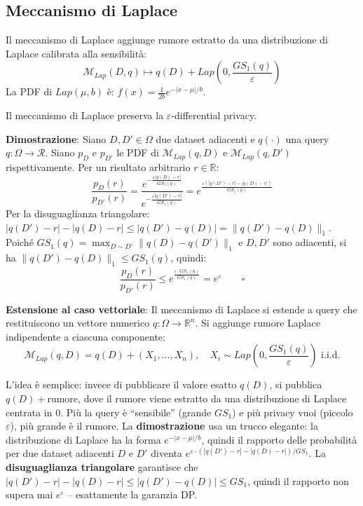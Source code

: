 \documentclass[a4paper,11pt]{article}
\begin{document}
\subsection{Meccanismo di Laplace}

\begin{teorema}
Il meccanismo di Laplace aggiunge rumore estratto da una distribuzione di Laplace calibrata alla sensibilit\`{a}:
\[
\mathcal{M}_{Lap}(D, q) \mapsto q(D) + Lap\!\left(0, \frac{GS_1(q)}{\varepsilon}\right)
\]
La PDF di $Lap(\mu, b)$ \`{e}: $f(x) = \frac{1}{2b} e^{-|x-\mu|/b}$.

Il meccanismo di Laplace preserva la $\varepsilon$-differential privacy.

\textbf{Dimostrazione}: Siano $D, D' \in \Omega$ due dataset adiacenti e $q(\cdot)$ una query $q: \Omega \to \mathcal{R}$. Siano $p_D$ e $p_{D'}$ le PDF di $\mathcal{M}_{Lap}(q, D)$ e $\mathcal{M}_{Lap}(q, D')$ rispettivamente. Per un risultato arbitrario $r \in \mathbb{R}$:
\[
\frac{p_D(r)}{p_{D'}(r)} = \frac{e^{-\frac{\varepsilon|q(D)-r|}{GS_1(q)}}}{e^{-\frac{\varepsilon|q(D')-r|}{GS_1(q)}}} = e^{\frac{\varepsilon(|q(D')-r|-|q(D)-r|)}{GS_1(q)}}
\]
Per la disuguaglianza triangolare: $|q(D')-r| - |q(D)-r| \leq |q(D') - q(D)| = \|q(D')-q(D)\|_1$. Poich\'{e} $GS_1(q) = \max_{D \sim D'}\|q(D)-q(D')\|_1$ e $D, D'$ sono adiacenti, si ha $\|q(D')-q(D)\|_1 \leq GS_1(q)$, quindi:
\[
\frac{p_D(r)}{p_{D'}(r)} \leq e^{\frac{\varepsilon \cdot GS_1(q)}{GS_1(q)}} = e^{\varepsilon} \qquad \square
\]

\textbf{Estensione al caso vettoriale}: Il meccanismo di Laplace si estende a query che restituiscono un vettore numerico $q: \Omega \to \mathbb{R}^n$. Si aggiunge rumore Laplace indipendente a ciascuna componente:
\[
\mathcal{M}_{Lap}(q, D) = q(D) + (X_1, \ldots, X_n), \quad X_i \sim Lap\!\left(0, \frac{GS_1(q)}{\varepsilon}\right) \text{ i.i.d.}
\]
\end{teorema}

\begin{nota}
L'idea è semplice: invece di pubblicare il valore esatto $q(D)$, si pubblica $q(D) + \text{rumore}$, dove il rumore viene estratto da una distribuzione di Laplace centrata in 0. Più la query è ``sensibile'' (grande $GS_1$) e più privacy vuoi (piccolo $\varepsilon$), più grande è il rumore. La \textbf{dimostrazione} usa un trucco elegante: la distribuzione di Laplace ha la forma $e^{-|x-\mu|/b}$, quindi il rapporto delle probabilità per due dataset adiacenti $D$ e $D'$ diventa $e^{\varepsilon \cdot (|q(D')-r| - |q(D)-r|)/GS_1}$. La \textbf{disuguaglianza triangolare} garantisce che $|q(D')-r| - |q(D)-r| \leq |q(D')-q(D)| \leq GS_1$, quindi il rapporto non supera mai $e^\varepsilon$ -- esattamente la garanzia DP.
\end{nota}
\end{document}
